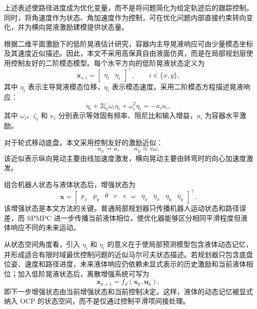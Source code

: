 \documentclass[12pt,a4paper]{ctexart}
\newcommand{\SPMPC}{SPMPC}
\newcommand{\xaug}{\bm{x}}
\newcommand{\vu}{\bm{u}}
\begin{document}
上述表述使路径进度成为优化变量，而不是将问题简化为给定轨迹后的跟踪控制。同时，将角速度作为状态、角加速度作为控制，可在优化问题内部直接约束转向变化，并为横向晃液激励建模提供状态量。

根据二维平面激励下的低阶晃液估计研究，容器内主导晃液响应可由少量模态坐标及其速度近似描述\cite{A01_Leva2021,A02_Guagliumi2021}。因此，本文不采用高保真自由液面仿真，而是在局部规划层使用控制友好的二阶模态模型。每个水平方向的低阶晃液状态定义为
\begin{equation}
  \bm{x}_{s,i}=\begin{bmatrix}\eta_i & \dot{\eta}_i\end{bmatrix}^{\top},
  \qquad i\in\{x,y\},
\end{equation}
其中 $\eta_i$ 表示主导晃液模态位移，$\dot{\eta}_i$ 表示模态速度。采用二阶模态方程描述晃液响应：
\begin{equation}
  \ddot{\eta}_i + 2\zeta_i\omega_i\dot{\eta}_i + \omega_i^2\eta_i = -\kappa_i a_i,
\end{equation}
其中 $\omega_i$、$\zeta_i$ 和 $\kappa_i$ 分别表示等效固有频率、阻尼比和输入增益，$a_i$ 为容器水平激励。

对于轮式移动底盘，本文采用控制友好的激励近似：
\begin{equation}
  a_x = a, \qquad a_y \approx v\omega .
\end{equation}
该近似表示纵向晃动主要由线加速度激发，横向晃动主要由转弯时的向心加速度激发。

组合机器人状态与液体状态后，增强状态为
\begin{equation}
  \xaug =
  \begin{bmatrix}
    p_x & p_y & \theta & v & s & \omega &
    \eta_x & \dot{\eta}_x & \eta_y & \dot{\eta}_y
  \end{bmatrix}^{\top}.
\end{equation}
该增强状态是本文方法的关键。普通局部规划器只传播机器人运动状态和路径误差，而 \SPMPC{} 进一步传播当前液体相位，使优化器能够区分相同平滑程度但液体响应不同的未来运动。

从状态空间角度看，引入 $\eta_i$ 和 $\dot{\eta}_i$ 的意义在于使局部预测模型包含液体动态记忆，并形成适合有限时域最优控制问题的近似马尔可夫状态描述。若规划器只包含底盘位姿、速度和路径进度，未来液体响应仍依赖未显式表示的历史激励和当前液体相位；加入低阶晃液状态后，离散增强系统可写为
\begin{equation}
  \xaug_{k+1}=f_d(\xaug_k,\vu_k),
\end{equation}
即下一步增强状态由当前增强状态和当前控制决定。这样，液体的动态记忆被显式纳入 OCP 的状态空间，而不是仅通过控制平滑项间接处理。
\end{document}
